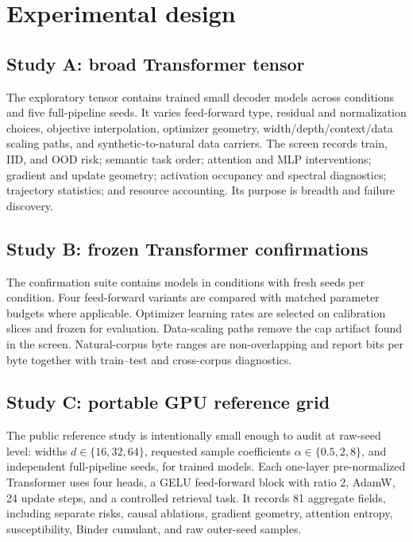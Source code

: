 \section{Experimental design}
\label{sec:design}

\subsection{Study A: broad Transformer tensor}

The exploratory tensor contains \PhaseTensorRuns{} trained small decoder models
across \PhaseTensorConditions{} conditions and five full-pipeline seeds. It
varies feed-forward type, residual and normalization choices, objective
interpolation, optimizer geometry, width/depth/context/data scaling paths, and
synthetic-to-natural data carriers. The screen records train, IID, and OOD risk;
semantic task order; attention and MLP interventions; gradient and update
geometry; activation occupancy and spectral diagnostics; trajectory statistics;
and resource accounting. Its purpose is breadth and failure discovery.

\subsection{Study B: frozen Transformer confirmations}

The confirmation suite contains \PhaseConfirmRuns{} models in
\PhaseConfirmConditions{} conditions with \PhaseConfirmSeeds{} fresh seeds per
condition. Four feed-forward variants are compared with matched parameter
budgets where applicable. Optimizer learning rates are selected on calibration
slices and frozen for evaluation. Data-scaling paths remove the cap artifact
found in the screen. Natural-corpus byte ranges are non-overlapping and report
bits per byte together with train--test and cross-corpus diagnostics.

\subsection{Study C: portable GPU reference grid}

The public reference study is intentionally small enough to audit at raw-seed
level: widths $d\in\{16,32,64\}$, requested sample coefficients
$\alpha\in\{0.5,2,8\}$, and \ReferenceSeeds{} independent full-pipeline seeds,
for \ReferenceRuns{} trained models. Each one-layer pre-normalized Transformer
uses four heads, a GELU feed-forward block with ratio 2, AdamW, 24 update steps,
and a controlled retrieval task. It records 81 aggregate fields, including
separate risks, causal ablations, gradient geometry, attention entropy,
susceptibility, Binder cumulant, and raw outer-seed samples.

